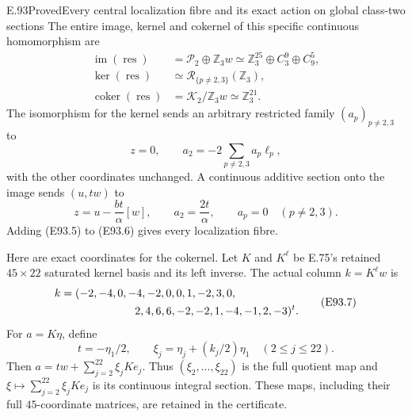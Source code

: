 \begin{statement}{E.93}{Proved}{Every central localization fibre and its exact action on global class-two sections}
The entire image, kernel and cokernel of this specific
continuous homomorphism are
\[
 \begin{aligned}
 \operatorname{im}(\operatorname{res})
    &=\mathcal P_2\oplus\mathbb Z_3w
      \simeq\mathbb Z_3^{25}\oplus C_3^9\oplus C_9^5,\\
 \ker(\operatorname{res})
    &\simeq\mathcal R_{\{p\ne2,3\}}(\mathbb Z_3),\\
 \operatorname{coker}(\operatorname{res})
    &=\mathcal K_2/\mathbb Z_3w\simeq\mathbb Z_3^{21}.
 \end{aligned}
 \tag{E93.4}
\]
The isomorphism for the kernel sends an arbitrary restricted
family $(a_p)_{p\ne2,3}$ to
\[
 z=0,\qquad
 a_2=-2\sum_{p\ne2,3}a_p\ell_p,
 \tag{E93.5}
\]
with the other coordinates unchanged. A continuous additive
section onto the image sends $(u,t w)$ to
\[
 z=u-\frac{bt}{\alpha}[w],\qquad
 a_2=\frac{2t}{\alpha},\qquad a_p=0\quad(p\ne2,3).
 \tag{E93.6}
\]
Adding (E93.5) to (E93.6) gives every localization fibre.

Here are exact coordinates for the cokernel. Let $K$ and
$K^{\ell}$ be E.75's retained $45\times22$ saturated kernel
basis and its left inverse. The actual column $k=K^{\ell}w$ is
\[
 \begin{split}
 k={}&(-2,-4,0,-4,-2,0,0,1,-2,3,0,\\
     &\hspace{19mm}2,4,6,6,-2,-2,1,-4,-1,2,-3)^t.
 \end{split}
 \tag{E93.7}
\]
For $a=K\eta$, define
\[
 t=-\eta_1/2,\qquad
 \xi_j=\eta_j+(k_j/2)\eta_1\quad(2\le j\le22).
 \tag{E93.8}
\]
Then $a=t w+\sum_{j=2}^{22}\xi_j K e_j$.
Thus $(\xi_2,\ldots,\xi_{22})$ is the full quotient
map and $\xi\mapsto\sum_{j=2}^{22}\xi_j K e_j$ is its
continuous integral section. These maps, including their
full $45$-coordinate matrices, are retained in the certificate.


\end{statement}
